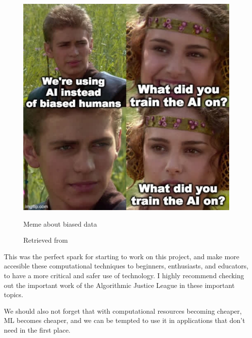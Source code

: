 \begin{figure}[ht]
  \centering
  \includegraphics[width=0.75\linewidth,height=0.25\textheight,keepaspectratio]{images/meme-star-wars.jpg}
  \caption{Meme about biased data}
  \caption*{Retrieved from \cite{website-twitter-janellecshane-meme}}
  \label{fig:meme-star-wars}
\end{figure}

This was the perfect spark for starting to work on this project, and make more accesible these computational techniques to beginners, enthusiasts, and educators, to have a more critical and safer use of technology. I highly recommend checking out the important work of the Algorithmic Justice League in these important topics.

We should also not forget that with computational resources becoming cheaper, \acrshort{ML} becomes cheaper, and we can be tempted to use it in applications that don't need in the first place.


